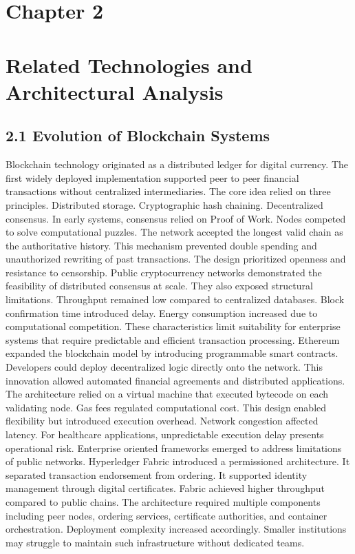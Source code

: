 \section*{Chapter 2}
\label{ch:2}


\section*{Related Technologies and Architectural Analysis}

\subsection*{2.1 Evolution of Blockchain Systems}
Blockchain technology originated as a distributed ledger for digital currency. The first widely deployed implementation supported peer to peer financial transactions without centralized intermediaries. The core idea relied on three principles. Distributed storage. Cryptographic hash chaining. Decentralized consensus.
In early systems, consensus relied on Proof of Work. Nodes competed to solve computational puzzles. The network accepted the longest valid chain as the authoritative history. This mechanism prevented double spending and unauthorized rewriting of past transactions. The design prioritized openness and resistance to censorship.
Public cryptocurrency networks demonstrated the feasibility of distributed consensus at scale. They also exposed structural limitations. Throughput remained low compared to centralized databases. Block confirmation time introduced delay. Energy consumption increased due to computational competition. These characteristics limit suitability for enterprise systems that require predictable and efficient transaction processing.
Ethereum expanded the blockchain model by introducing programmable smart contracts. Developers could deploy decentralized logic directly onto the network. This innovation allowed automated financial agreements and distributed applications. The architecture relied on a virtual machine that executed bytecode on each validating node. Gas fees regulated computational cost. This design enabled flexibility but introduced execution overhead. Network congestion affected latency. For healthcare applications, unpredictable execution delay presents operational risk.
Enterprise oriented frameworks emerged to address limitations of public networks. Hyperledger Fabric introduced a permissioned architecture. It separated transaction endorsement from ordering. It supported identity management through digital certificates. Fabric achieved higher throughput compared to public chains. The architecture required multiple components including peer nodes, ordering services, certificate authorities, and container orchestration. Deployment complexity increased accordingly. Smaller institutions may struggle to maintain such infrastructure without dedicated teams.
